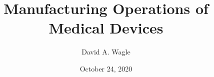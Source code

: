 
\usepackage[utf8]{inputenc}
\usepackage{pgfpages}

\usepackage{palatino}



\title{Manufacturing Operations of Medical Devices}
\author{David A. Wagle}
\date{October 24, 2020}
